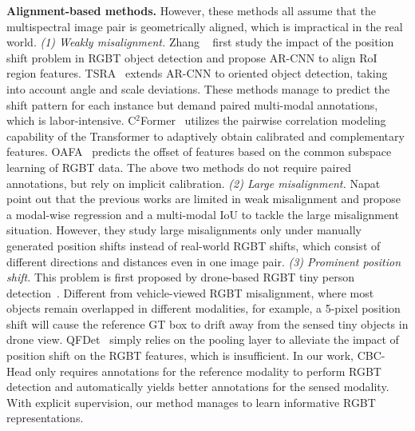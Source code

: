\textbf{Alignment-based methods.} 
However, these methods all assume that the multispectral image pair is geometrically aligned, which is impractical in the real world. 
\textit{(1) Weakly misalignment.} Zhang \etal~\cite{zhang2019weakly} first study the impact of the position shift problem in RGBT object detection and propose AR-CNN to align RoI region features. TSRA~\cite{yuan2022translation,yuan2024improving} extends AR-CNN to oriented object detection, taking into account angle and scale deviations. These methods manage to predict the shift pattern for each instance but demand paired multi-modal annotations, which is labor-intensive. C$^2$Former~\cite{yuan2024c} utilizes the pairwise correlation modeling capability of the Transformer to adaptively obtain calibrated and complementary features. OAFA~\cite{chen2024weakly} predicts the offset of features based on the common subspace learning of RGBT data. The above two methods do not require paired annotations, but rely on implicit calibration. 
\textit{(2) Large misalignment.} Napat \etal~\cite{napat2021misalignment} point out that the previous works are limited in weak misalignment and propose a modal-wise regression and a multi-modal IoU to tackle the large misalignment situation. However, they study large misalignments only under manually generated position shifts instead of real-world RGBT shifts, which consist of different directions and distances even in one image pair. 
\textit{(3) Prominent position shift.} This problem is first proposed by drone-based RGBT tiny person detection~\cite{zhang2023drone}. Different from vehicle-viewed RGBT misalignment, where most objects remain overlapped in different modalities, for example, a 5-pixel position shift will cause the reference GT box to drift away from the sensed tiny objects in drone view. QFDet~\cite{zhang2023drone} simply relies on the pooling layer to alleviate the impact of position shift on the RGBT features, which is insufficient.
In our work, CBC-Head only requires annotations for the reference modality to perform RGBT detection and automatically yields better annotations for the sensed modality. With explicit supervision, our method manages to learn informative RGBT representations.

